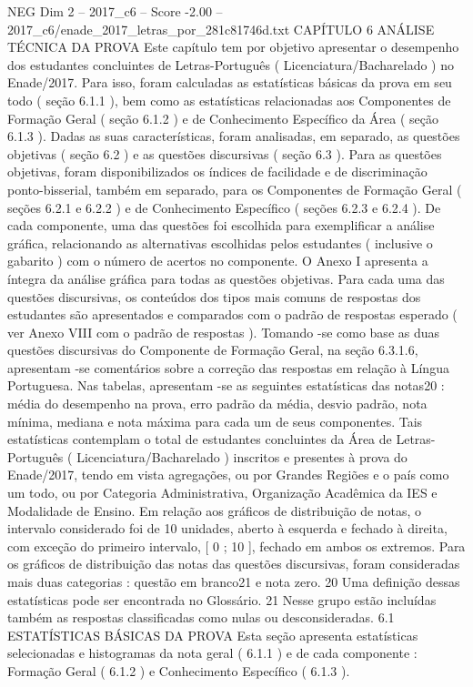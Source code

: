 \begin{textsample}{NEG Dim 2 – 2017\_c6 – Score -2.00 – 2017\_c6/enade\_2017\_letras\_por\_281c81746d.txt}  \label{ex:f2_neg_165}
CAPÍTULO 6 ANÁLISE TÉCNICA DA PROVA Este capítulo tem por objetivo apresentar o desempenho dos estudantes concluintes de Letras-Português ( Licenciatura/Bacharelado ) no Enade/2017.
Para isso, foram calculadas as estatísticas básicas da prova em seu todo ( seção 6.1.1 ), bem como as estatísticas relacionadas aos Componentes de Formação Geral ( seção 6.1.2 ) e de Conhecimento Específico da Área ( seção 6.1.3 ).
Dadas as suas características, foram analisadas, em separado, as questões objetivas ( seção 6.2 ) e as questões discursivas ( seção 6.3 ).
Para as questões objetivas, foram disponibilizados os índices de facilidade e de discriminação ponto-bisserial, também em separado, para os Componentes de Formação Geral ( seções 6.2.1 e 6.2.2 ) e de Conhecimento Específico ( seções 6.2.3 e 6.2.4 ).
De cada componente, uma das questões foi escolhida para exemplificar a análise gráfica, relacionando as alternativas escolhidas pelos estudantes ( inclusive o gabarito ) com o número de acertos no componente.
O Anexo I apresenta a íntegra da análise gráfica para todas as questões objetivas.
Para cada uma das questões discursivas, os conteúdos dos tipos mais comuns de respostas dos estudantes são apresentados e comparados com o padrão de respostas esperado ( ver Anexo VIII com o padrão de respostas ).
Tomando -se como base as duas questões discursivas do Componente de Formação Geral, na seção 6.3.1.6, apresentam -se comentários sobre a correção das respostas em relação à Língua Portuguesa.
Nas tabelas, apresentam -se as seguintes estatísticas das notas20 : média do desempenho na prova, erro padrão da média, desvio padrão, nota mínima, mediana e nota máxima para cada um de seus componentes.
Tais estatísticas contemplam o total de estudantes concluintes da Área de Letras-Português ( Licenciatura/Bacharelado ) inscritos e presentes à prova do Enade/2017, tendo em vista agregações, ou por Grandes Regiões e o país como um todo, ou por Categoria Administrativa, Organização Acadêmica da IES e Modalidade de Ensino.
Em relação aos gráficos de distribuição de notas, o intervalo considerado foi de 10 unidades, aberto à esquerda e fechado à direita, com exceção do primeiro intervalo, [ 0 ; 10 ], fechado em ambos os extremos.
Para os gráficos de distribuição das notas das questões discursivas, foram consideradas mais duas categorias : questão em branco21 e nota zero. 20 Uma definição dessas estatísticas pode ser encontrada no Glossário. 21 Nesse grupo estão incluídas também as respostas classificadas como nulas ou desconsideradas. 6.1 ESTATÍSTICAS BÁSICAS DA PROVA Esta seção apresenta estatísticas selecionadas e histogramas da nota geral ( 6.1.1 ) e de cada componente : Formação Geral ( 6.1.2 ) e Conhecimento Específico ( 6.1.3 ).

\end{textsample}
